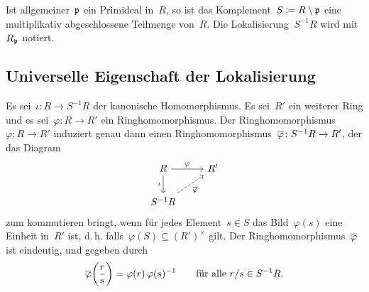 \begin{example}
  Ist allgemeiner~$\mathfrak{p}$ ein Primideal in~$R$, so ist das Komplement~$S \coloneqq R \setminus \mathfrak{p}$ eine multiplikativ abgeschlossene Teilmenge von~$R$.
  Die Lokalisierung~$S^{-1} R$ wird mit~$R_{\mathfrak{p}}$ notiert.
\end{example}




\subsection{Universelle Eigenschaft der Lokalisierung}

\begin{theorem}
  Es sei~$\iota \colon R \to S^{-1} R$ der kanonische Homomorphismus.
  Es sei~$R'$ ein weiterer Ring und es sei~$\varphi \colon R \to R'$ ein Ringhomomorphismus.
  Der Ringhomomorphismus~$\varphi \colon R \to R'$ induziert genau dann einen Ringhomomorphismus~$\induced{\varphi} \colon S^{-1} R \to R'$, der das Diagram
  \[
    \begin{tikzcd}
      R
      \arrow{r}[above]{\varphi}
      \arrow{d}[left]{\iota}
      &
      R'
      \\
      S^{-1} R
      \arrow[dashed]{ur}[below right]{\induced{\varphi}}
      &
      {}
    \end{tikzcd}
  \]
  zum kommutieren bringt, wenn für jedes Element~$s \in S$ das Bild~$\varphi(s)$ eine Einheit in~$R'$ ist, d.\,h. falls~$\varphi(S) \subseteq (R')^\times$ gilt.
  Der Ringhomomorphismus~$\overline{\varphi}$ ist eindeutig, und gegeben durch
  \[
    \overline{\varphi}\biggl( \frac{r}{s} \biggr)
    =
    \varphi(r) \, \varphi(s)^{-1}
    \qquad
    \text{für alle~$r/s \in S^{-1} R$.}
  \]
\end{theorem}


